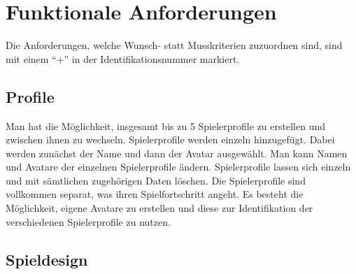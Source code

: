 \section{Funktionale Anforderungen}

Die Anforderungen, welche Wunsch- statt Musskriterien zuzuordnen sind, sind mit einem "`+"' in der Identifikationsnummer markiert.

\subsection{Profile}

\begin{requirements}
	Man hat die Möglichkeit, insgesamt bis zu 5 Spielerprofile zu erstellen und zwischen ihnen zu wechseln.
	 Spielerprofile werden einzeln hinzugefügt. Dabei werden zunächst der Name und dann der Avatar ausgewählt.
	 Man kann Namen und Avatare der einzelnen Spielerprofile ändern.
	 Spielerprofile lassen sich einzeln und mit sämtlichen zugehörigen Daten löschen.
	Die Spielerprofile sind vollkommen separat, was ihren Spielfortschritt angeht.
	Es besteht die Möglichkeit, eigene Avatare zu erstellen und diese zur Identifikation der verschiedenen Spielerprofile zu nutzen.
\end{requirements}

\subsection{Spieldesign}

